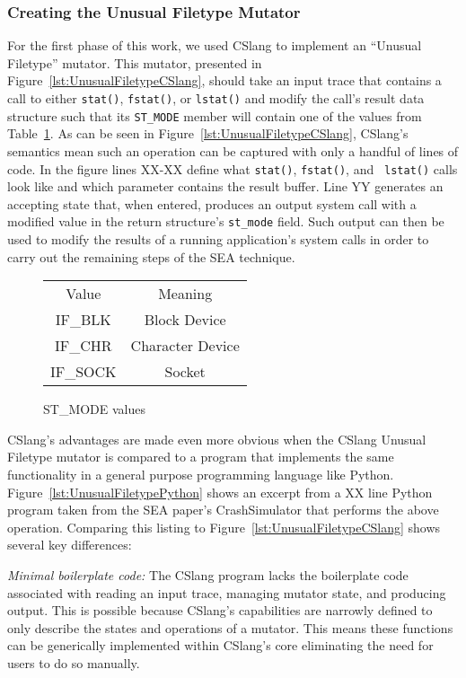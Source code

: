 \subsubsection{Creating the Unusual Filetype Mutator}
\label{subsub:UnusualFiletype}
For the first phase of this work,
we used CSlang to implement an ``Unusual Filetype''
mutator.
This mutator, presented in
Figure~\ref{lst:UnusualFiletypeCSlang},
should take an input trace
that contains a call to either {\tt stat()},
{\tt fstat()},
or {\tt lstat()}
and modify the call's result data structure such
that its {\tt ST\_MODE} member will contain one of the values from
Table~\ref{tbl:ST_MODEValues}.  As can be seen in
Figure~\ref{lst:UnusualFiletypeCSlang}, CSlang's semantics mean such an
operation can be captured with only a handful of lines of code.  In the
figure
lines XX-XX define what {\tt stat()}, {\tt fstat()}, and {\tt
lstat()} calls look like and which parameter contains the result buffer.
Line YY generates an accepting state that, when entered, produces an output
system call with a modified value in the return structure's {\tt st\_mode}
field.  Such output can then be used to modify the results of a running
application's system calls in order to carry out the remaining steps of the
SEA technique.

\begin{figure}
  \begin{tabular}{|c|c}
  Value    & Meaning          \\
  IF\_BLK  & Block Device     \\
  IF\_CHR  & Character Device \\
  IF\_SOCK & Socket           \\
\end{tabular}
\caption{ST\_MODE values}
\label{tbl:ST_MODEValues}
\end{figure}

CSlang's advantages are made even more obvious when the CSlang Unusual
Filetype mutator is compared to a program that implements the same
functionality in a general purpose programming language like Python.
Figure~\ref{lst:UnusualFiletypePython} shows an excerpt from a XX line
Python program taken from the SEA paper's CrashSimulator that performs the
above operation.  Comparing this listing to
Figure~\ref{lst:UnusualFiletypeCSlang} shows several key differences:

\textit{Minimal boilerplate code:} The CSlang program lacks the boilerplate
code associated with
reading an input trace, managing mutator state, and producing output.
This is possible because CSlang's capabilities are narrowly defined to
only describe the states and operations of a mutator.  This means these
functions can be generically implemented within CSlang's core eliminating
the need for users to do so manually.

